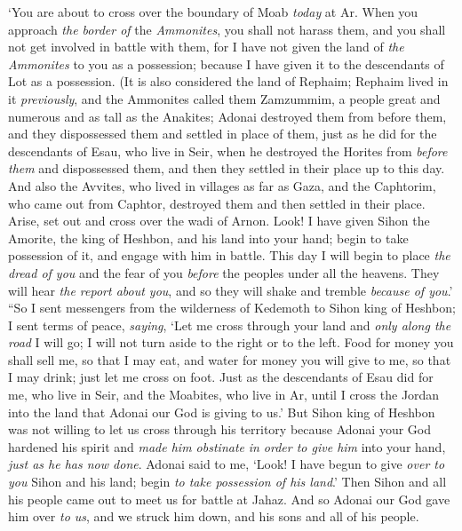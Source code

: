 \begin{biblechapter}
\verse ‘You are about to cross over the boundary of Moab \textit{today} at Ar.
\verse When you approach \textit{the border of} the \textit{Ammonites}, you shall not harass them, and you shall not get involved in battle with them, for I have not given the land of \textit{the Ammonites} to you as a possession; because I have given it to the descendants of Lot as a possession.
\verse (It is also considered the land of Rephaim; Rephaim lived in it \textit{previously}, and the Ammonites called them Zamzummim,
\verse a people great and numerous and as tall as the Anakites; Adonai destroyed them from before them, and they dispossessed them and settled in place of them,
\verse just as he did for the descendants of Esau, who live in Seir, when he destroyed the Horites from \textit{before them} and dispossessed them, and then they settled in their place up to this day.
\verse And also the Avvites, who lived in villages as far as Gaza, and the Caphtorim, who came out from Caphtor, destroyed them and then settled in their place.
\verse Arise, set out and cross over the wadi of Arnon. Look! I have given Sihon the Amorite, the king of Heshbon, and his land into your hand; begin to take possession of it, and engage with him in battle.
\verse This day I will begin to place \textit{the dread of you} and the fear of you \textit{before} the peoples under all the heavens. They will hear \textit{the report about you}, and so they will shake and tremble \textit{because of you}.’ 
\verse “So I sent messengers from the wilderness of Kedemoth to Sihon king of Heshbon; I sent terms of peace, \textit{saying},
\verse ‘Let me cross through your land and \textit{only along the road} I will go; I will not turn aside to the right or to the left.
\verse Food for money you shall sell me, so that I may eat, and water for money you will give to me, so that I may drink; just let me cross on foot.
\verse Just as the descendants of Esau did for me, who live in Seir, and the Moabites, who live in Ar, until I cross the Jordan into the land that Adonai our God is giving to us.’
\verse But Sihon king of Heshbon was not willing to let us cross through his territory because Adonai your God hardened his spirit and \textit{made him obstinate} \textit{in order to give him} into your hand, \textit{just as he has now done}.
\verse Adonai said to me, ‘Look! I have begun to give \textit{over to you} Sihon and his land; begin \textit{to take possession of his land}.’
\verse Then Sihon and all his people came out to meet us for battle at Jahaz.
\verse And so Adonai our God gave him over \textit{to us}, and we struck him down, and his sons and all of his people.

\end{biblechapter}
